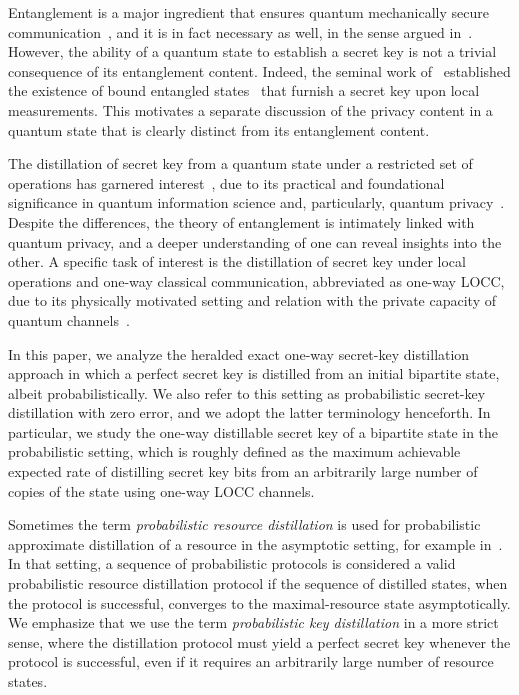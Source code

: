 \documentclass[twocolumn,letterpaper, dvipsnames,allowtoday, accepted = 2025-12-31]{quantumarticle}
\begin{document}
Entanglement is a major ingredient that ensures quantum mechanically secure communication~\cite{Ekert91}, and it is in fact necessary as well, in the sense argued in~\cite{CLL04}. However, the ability of a quantum state to establish a secret key is not a trivial consequence of its entanglement content. Indeed, the seminal work of~\cite{HHHO05, HHHO09} established the existence of bound entangled states~\cite{HHH98} that furnish a secret key upon local measurements. This motivates a separate discussion of the privacy content in a quantum state that is clearly distinct from its entanglement content.

The distillation of secret key from a quantum state under a restricted set of operations has garnered interest~\cite{DW2005, HHHO05, Christandl06, CEHHOR07, HHHLO08, HHHO09, CSW12}, due to its practical and foundational significance in quantum information science and, particularly, quantum privacy~\cite{WTB17, QSW18}. Despite the differences, the theory of entanglement is intimately linked with quantum privacy, and a deeper understanding of one can reveal insights into the other. A specific task of interest is the distillation of secret key under local operations and one-way classical communication, abbreviated as one-way LOCC, due to its physically motivated setting and relation with the private capacity of quantum channels~\cite{CWY04, Dev05}.

In this paper, we analyze the heralded exact one-way secret-key distillation  approach
in which a perfect secret key is distilled from an initial bipartite state, albeit probabilistically. We also refer to this setting as probabilistic secret-key distillation with zero error, and we adopt the latter terminology henceforth. In particular, we study the one-way distillable secret key of a bipartite state in the
probabilistic setting, which is roughly defined as the maximum achievable expected rate of distilling secret key bits from an arbitrarily large number
of copies of the state using one-way LOCC channels. 

Sometimes the term \emph{probabilistic resource distillation} is used for probabilistic approximate distillation of a resource in the asymptotic setting, for example in~\cite{Regula22,Regula22b}. In that setting, a sequence of probabilistic protocols is considered a valid probabilistic resource distillation protocol if the sequence of distilled states, when the protocol is successful, converges to the maximal-resource state asymptotically. We emphasize that we use the term \emph{probabilistic key distillation} in a more strict sense, where the distillation protocol must yield a perfect secret key whenever the protocol is successful, even if it requires an arbitrarily large number of resource states.
\end{document}
